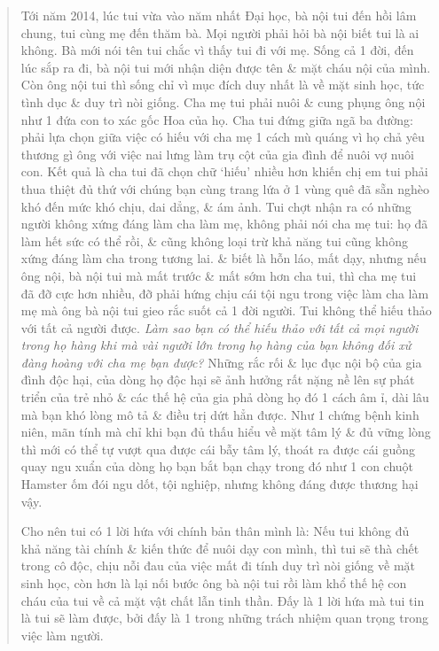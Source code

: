 \documentclass[12pt,oneside]{book}
\begin{document}
\begin{quote}
	Tới năm 2014, lúc tui vừa vào năm nhất Đại học, bà nội tui đến hồi lâm chung, tui cùng mẹ đến thăm bà. Mọi người phải hỏi bà nội biết tui là ai không. Bà mới nói tên tui chắc vì thấy tui đi với mẹ. Sống cả 1 đời, đến lúc sắp ra đi, bà nội tui mới nhận diện được tên \& mặt cháu nội của mình. Còn ông nội tui thì sống chỉ vì mục đích duy nhất là về mặt sinh học, tức tình dục \& duy trì nòi giống. Cha mẹ tui phải nuôi \& cung phụng ông nội như 1 đứa con to xác gốc Hoa của họ. Cha tui đứng giữa ngã ba đường: phải lựa chọn giữa việc có hiếu với cha mẹ 1 cách mù quáng vì họ chả yêu thương gì ông với việc nai lưng làm trụ cột của gia đình để nuôi vợ nuôi con. Kết quả là cha tui đã chọn chữ `hiếu' nhiều hơn khiến chị em tui phải thua thiệt đủ thứ với chúng bạn cùng trang lứa ở 1 vùng quê đã sẵn nghèo khó đến mức khó chịu, dai dẳng, \& ám ảnh. Tui chợt nhận ra có những người không xứng đáng làm cha làm mẹ, không phải nói cha mẹ tui: họ đã làm hết sức có thể rồi, \& cũng không loại trừ khả năng tui cũng không xứng đáng làm cha trong tương lai. \& biết là hỗn láo, mất dạy, nhưng nếu ông nội, bà nội tui mà mất trước \& mất sớm hơn cha tui, thì cha mẹ tui đã đỡ cực hơn nhiều, đỡ phải hứng chịu cái tội ngu trong việc làm cha làm mẹ mà ông bà nội tui gieo rắc suốt cả 1 đời người. Tui không thể hiếu thảo với tất cả người được. {\it Làm sao bạn có thể hiếu thảo với tất cả mọi người trong họ hàng khi mà vài người lớn trong họ hàng của bạn không đối xử đàng hoàng với cha mẹ bạn được?} Những rắc rối \& lục đục nội bộ của gia đình độc hại, của dòng họ độc hại sẽ ảnh hưởng rất nặng nề lên sự phát triển của trẻ nhỏ \& các thế hệ của gia phả dòng họ đó 1 cách âm ỉ, dài lâu mà bạn khó lòng mô tả \& điều trị dứt hẳn được. Như 1 chứng bệnh kinh niên, mãn tính mà chỉ khi bạn đủ thấu hiểu về mặt tâm lý \& đủ vững lòng thì mới có thể tự vượt qua được cái bẫy tâm lý, thoát ra được cái guồng quay ngu xuẩn của dòng họ bạn bắt bạn chạy trong đó như 1 con chuột Hamster ốm đói ngu dốt, tội nghiệp, nhưng không đáng được thương hại vậy.
	
	Cho nên tui có 1 lời hứa với chính bản thân mình là: Nếu tui không đủ khả năng tài chính \& kiến thức để nuôi dạy con mình, thì tui sẽ thà chết trong cô độc, chịu nỗi đau của việc mất đi tính duy trì nòi giống về mặt sinh học, còn hơn là lại nối bước ông bà nội tui rồi làm khổ thế hệ con cháu của tui về cả mặt vật chất lẫn tinh thần. Đấy là 1 lời hứa mà tui tin là tui sẽ làm được, bởi đấy là 1 trong những trách nhiệm quan trọng trong việc làm người.
\end{quote}
\end{document}
